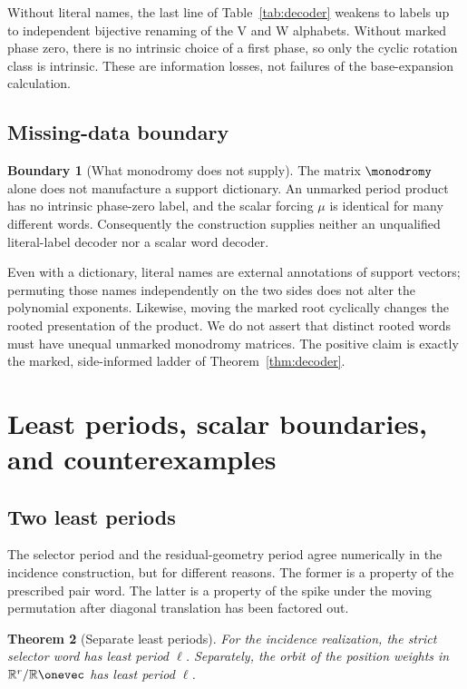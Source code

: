 \documentclass[11pt,letterpaper]{article}
\newtheorem{theorem}{Theorem}[section]
\theoremstyle{definition}
\newtheorem{boundary}[theorem]{Boundary}
\theoremstyle{remark}
\numberwithin{equation}{section}
\begin{document}
Without literal names, the last line of Table~\ref{tab:decoder} weakens to
labels up to independent bijective renaming of the V and W alphabets.
Without marked phase zero, there is no intrinsic choice of a first phase, so
only the cyclic rotation class is intrinsic.  These are information losses,
not failures of the base-expansion calculation.

\subsection{Missing-data boundary}

\begin{boundary}[What monodromy does not supply]
\label{rem:decoder-boundary}
The matrix \(\monodromy\) alone does not manufacture a support dictionary.
An unmarked period product has no intrinsic phase-zero label, and the scalar
forcing \(\mu\) is identical for many different words.  Consequently the
construction supplies neither an unqualified literal-label decoder nor a
scalar word decoder.
\end{boundary}

Even with a dictionary, literal names are external annotations of support
vectors; permuting those names independently on the two sides does not alter
the polynomial exponents.  Likewise, moving the marked root cyclically
changes the rooted presentation of the product.  We do not assert that
distinct rooted words must have unequal unmarked monodromy matrices.  The
positive claim is exactly the marked, side-informed ladder of
Theorem~\ref{thm:decoder}.

\section{Least periods, scalar boundaries, and counterexamples}

\subsection{Two least periods}

The selector period and the residual-geometry period agree numerically in
the incidence construction, but for different reasons.  The former is a
property of the prescribed pair word.  The latter is a property of the spike
under the moving permutation after diagonal translation has been factored
out.

\begin{theorem}[Separate least periods]
\label{thm:least-periods}
For the incidence realization, the strict selector word has least period
\(\ell\).  Separately, the orbit of the position weights in
\(\mathbb R^r/\mathbb R\onevec\) has least period \(\ell\).
\end{theorem}
\end{document}
